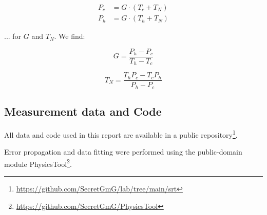 \begin{equation} \label{eq:P_to_Ta_sys}
	\begin{split}
		P_c &= G \cdot (T_c + T_N) \\
		P_h &= G \cdot (T_h + T_N)
	\end{split}
\end{equation} 

... for $G$ and $T_N$. We find:


\begin{equation} \label{eq:G}
	G = \frac{P_h-P_c}{T_h-T_c}
\end{equation} 

\begin{equation} \label{eq:TN}
	T_N = \frac{T_h P_c-T_c P_h}{P_h-P_c}
\end{equation} 

\subsection{Measurement data and Code}
All data and code used in this report are available in a public repository\footnote{\url{https://github.com/SecretGmG/lab/tree/main/srt}}.

Error propagation and data fitting were performed using the public-domain module PhysicsTool\footnote{\url{https://github.com/SecretGmG/PhysicsTool}}.
